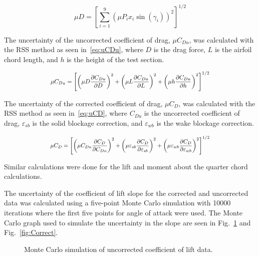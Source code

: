\documentclass[journal,letterpaper]{IEEEtran}
\begin{document}
\begin{equation} \label{eq:uFD}
    \mu D = \left[\sum_{i=1}^9 \left(\mu P_i x_i \sin\left(\gamma_i\right)\right)^2\right]^{1/2}
\end{equation}

The uncertainty of the uncorrected coefficient of drag, $\mu C_{Du}$, was calculated with the RSS method as seen in~\eqref{eq:uCDu}, where $D$ is the drag force, $L$ is the airfoil chord length, and $h$ is the height of the test section.

\begin{equation} \label{eq:uCDu}
    \resizebox{227pt}{!}{$\displaystyle{\mu C_{Du} = \left[\left(\mu D \frac{\partial C_{Du}}{\partial D}\right)^2 + \left(\mu L \frac{\partial C_{Du}}{\partial L}\right)^2 + \left(\mu h \frac{\partial C_{Du}}{\partial h}\right)^2\right]^{1/2}}$}
\end{equation}

The uncertainty of the corrected coefficient of drag, $\mu C_D$, was calculated with the RSS method as seen in~\eqref{eq:uCD}, where $C_{Du}$ is the uncorrected coefficient of drag, $\varepsilon_{sb}$ is the solid blockage correction, and $\varepsilon_{wb}$ is the wake blockage correction.

\begin{equation} \label{eq:uCD}
    \resizebox{227pt}{!}{$\displaystyle{\mu C_{D} = \left[\left(\mu C_{Du} \frac{\partial C_{D}}{\partial C_{Du}}\right)^2 + \left(\mu \varepsilon_{sb} \frac{\partial C_{D}}{\partial \varepsilon_{sb}}\right)^2 + \left(\mu \varepsilon_{wb} \frac{\partial C_{D}}{\partial \varepsilon_{wb}}\right)^2\right]^{1/2}}$}
\end{equation}

Similar calculations were done for the lift and moment about the quarter chord calculations.

The uncertainty of the coefficient of lift slope for the corrected and uncorrected data was calculated using a five-point Monte Carlo simulation with 10000 iterations where the first five points for angle of attack were used.
The Monte Carlo graph used to simulate the uncertainty in the slope are seen in Fig.~\ref{fig:Incorrect} and Fig.~\ref{fig:Correct}.

\begin{figure}[H]
    \centering
    
    \caption{Monte Carlo simulation of uncorrected coefficient of lift data.}
    \label{fig:Incorrect}
\end{figure}
\end{document}
